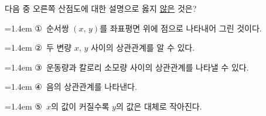\noindent\begin{minipage}[t]{0.58\linewidth}\vspace{0pt}\raggedright 다음 중 오른쪽 산점도에 대한 설명으로 옳지 \underline{않은} 것은?\end{minipage}\hfill\begin{minipage}[t]{0.4\linewidth}\vspace{0pt}\centering \resizebox{\ifdim\width>\linewidth\linewidth\else\width\fi}{!}{}\end{minipage}\par
\par\medskip\par\noindent\hangindent=1.4em {\small ①}\ 순서쌍 $(x,\,y)$를 좌표평면 위에 점으로 나타내어 그린 것이다.\par\noindent\hangindent=1.4em {\small ②}\ 두 변량 $x$, $y$ 사이의 상관관계를 알 수 있다.\par\noindent\hangindent=1.4em {\small ③}\ 운동량과 칼로리 소모량 사이의 상관관계를 나타낼 수 있다.\par\noindent\hangindent=1.4em {\small ④}\ 음의 상관관계를 나타낸다.\par\noindent\hangindent=1.4em {\small ⑤}\ $x$의 값이 커질수록 $y$의 값은 대체로 작아진다.\par\medskip
